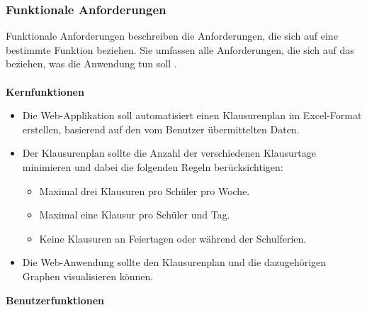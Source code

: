 \subsubsection{Funktionale Anforderungen}
Funktionale Anforderungen beschreiben die Anforderungen, die sich auf eine bestimmte Funktion beziehen. Sie umfassen alle Anforderungen, die sich auf das beziehen, was die Anwendung tun soll \parencite{anforderungen}.\\\\
\textbf{Kernfunktionen}
\begin{itemize}
    \item Die Web-Applikation soll automatisiert einen Klausurenplan im Excel-Format erstellen, basierend auf den vom Benutzer übermittelten Daten.

    \item Der Klausurenplan sollte die Anzahl der verschiedenen Klausurtage minimieren und dabei die folgenden Regeln berücksichtigen:
    \begin{itemize}
        \item Maximal drei Klausuren pro Schüler pro Woche.
        \item Maximal eine Klausur pro Schüler und Tag.
        \item Keine Klausuren an Feiertagen oder während der Schulferien.
    \end{itemize}

    \item Die Web-Anwendung sollte den Klausurenplan und die dazugehörigen Graphen visualisieren können.
\end{itemize}
\textbf{Benutzerfunktionen}
